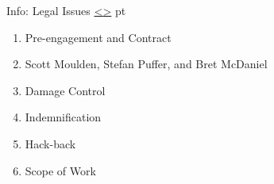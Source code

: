 \documentclass[12pt]{extarticle}
\newenvironment{instructionblock}{\Large\bgroup}{\egroup}
\newcounter{next}
\newcounter{prev}
\begin{document}
\pagebreak
{}
\begin{slide}{Info: Legal Issues}
{\hyperref[slide \theprev]{\textless}\hyperref[slide \thenext]{\textgreater}}
	 pt
	\begin{instructionblock}
		\begin{enumerate}
            \item Pre-engagement and Contract
            \item Scott Moulden, Stefan Puffer, and Bret McDaniel
            \item Damage Control
            \item Indemnification
            \item Hack-back
            \item Scope of Work
		\end{enumerate}
	\end{instructionblock}
\end{slide}
\end{document}
